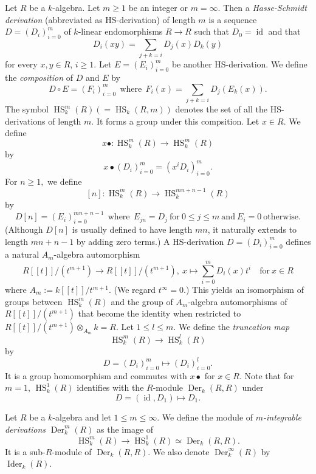 \documentclass{amsart}
\newcommand{\HS}{\operatorname{HS}}
\begin{document}
\begin{definition}[= {\cite[Definition 1.2.1-1.2.6]{NARVAEZMACARRO20122712}}] \label{Hasse Schmidt}
Let $R$ be a $k$-algebra. Let $m\ge 1$ be an integer or $m=\infty$. Then a \emph{Hasse-Schmidt derivation} (abbreviated as HS-derivation) of length $m$ is a sequence $D=(D_i)_{i=0}^m$ of $k$-linear endomorphisms $R\to R$ such that $D_0=\operatorname{id}$ and that $$D_i(xy)= \sum_{j+k=i}D_j(x)D_k(y)$$ for every $x,y\in R$, $ i\ge 1.$ Let $E=(E_i)_{i=0}^m$ be another HS-derivation. We define the \emph{composition} of $D$ and $E$ by
$$D\circ E=(F_i)_{i=0}^m \mathrm{\ \ where \ } \ F_i(x)=\sum_{j+k=i}D_j(E_k(x)).$$
The symbol $\operatorname{HS}_k^m(R)(=\operatorname{HS}_k(R,m))$ denotes the set of all the HS-derivations of length $m.$ It forms a group under this compsition. Let $x\in R$. We define 
$$ x \bullet: \operatorname{HS}_k^m(R)\to\operatorname{HS}_k^m(R)$$
by
$$x\bullet (D_i)_{i=0}^m=(x^iD_i)_{i=0}^m.$$
For $n\ge1,$ we define
$$[n]:\operatorname{HS}_k^m(R)\to\operatorname{HS}_k^{mn+n-1}(R)$$
by
$$D[n]=(E_i)_{i=0}^{mn+n-1}\mathrm{\ \ where\ }\ E_{jn}=D_j \mathrm{\ for\ }0\le j\le m \mathrm{\ and \ } E_i=0\mathrm{\ otherwise.}$$
(Although $D[n]$ is usually defined to have length $mn$, it naturally extends to length $mn+n-1$ by adding zero terms.)
A HS-derivation $D=(D_i)_{i=0}^m$ defines a natural $A_m$-algebra automorphism $$R[\![t]\!]/(t^{m+1})\to R[\![t]\!]/(t^{m+1}),\ x\mapsto \sum_{i=0}^m D_i(x) t^i\quad \mathrm{for}\ x\in R$$ 
where $A_m:=k[\![t]\!]/t^{m+1}$. (We regard $t^\infty=0$.) This yields an isomorphism of groups between $\HS_k^m(R)$ and the group of $A_m$-algebra automorphisms of $R[\![t]\!]/(t^{m+1}) $
that become the identity when restricted to $ R[\![t]\!]/(t^{m+1})\otimes_{A_m} k=R$.
Let $1\le l \le m$. We define the \emph{truncation map} $$\operatorname{HS}_k^m(R)\to \operatorname{HS}_k^l(R)$$ by $$D=(D_i)_{i=0}^m\mapsto(D_i)_{i=0}^l.$$ %
It is a group homomorphism and commutes with $x\bullet$ for $x\in R$.
Note that for $m=1$, $\operatorname{HS}_k^1(R)$ identifies with the $R$-module $\operatorname{Der}_k(R,R)$ under $$D=(\operatorname{id},D_1)\mapsto D_1.$$
\end{definition}

\begin{definition}[= {\cite[Definition 2.1.1]{NARVAEZMACARRO20122712},\ \cite[\S 1]{matsumura1982integrable}}] \label{m- inf- integrable der}Let $R$ be a $k$-algebra and let $1\le m \le \infty$. We define the module of\emph{ $m$-integrable derivations }$\operatorname{Der}_k^m(R)$ as the image of
$$\operatorname{HS}_k^m(R)\overset{}{\to}\operatorname{HS}_k^1(R)\simeq \operatorname{Der}_k(R,R).$$ It is a sub-$R$-module of $\operatorname{Der}_k(R,R)$. We also denote $\operatorname{Der}_k^\infty(R)$ by $\operatorname{Ider}_k(R)$.
\end{definition}
\end{document}
